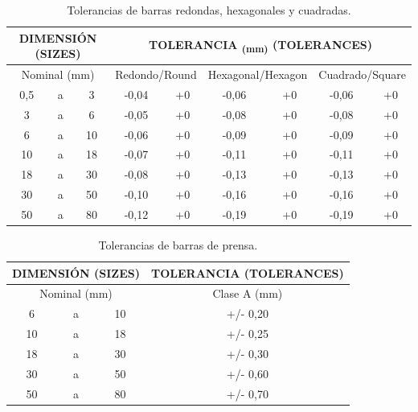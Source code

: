 \documentclass[12pt,a4paper]{article}
\begin{document}
\begin{table}[H]
   \centering
   \renewcommand{\arraystretch}{1.2}
   \begin{tabular}{|c|c|c|c|c|c|c|c|c|}
      \hline
      \multicolumn{3}{|p{3cm}|}{\textbf{DIMENSIÓN (SIZES)}} & \multicolumn{6}{|c|}{\textbf{TOLERANCIA \textsubscript{(\si{\milli\metre})} (TOLERANCES)}} \\ \hline
      \multicolumn{3}{|c|}{Nominal (\si{\milli\metre})} & \multicolumn{2}{|c|}{Redondo/Round} & \multicolumn{2}{|c|}{Hexagonal/Hexagon} & \multicolumn{2}{|c|}{Cuadrado/Square} \\ \hline
      0,5 & a & 3 & -0,04 & +0 & -0,06 & +0 & -0,06 & +0 \\ \hline
      3 & a & 6 & -0,05 & +0 & -0,08 & +0 & -0,08 & +0 \\ \hline
      6 & a & 10 & -0,06 & +0 & -0,09 & +0 & -0,09 & +0 \\ \hline 
      10 & a & 18 & -0,07 & +0 & -0,11 & +0 & -0,11 & +0 \\ \hline
      18 & a & 30 & -0,08 & +0 & -0,13 & +0 & -0,13 & +0 \\ \hline
      30 & a & 50 & -0,10 & +0 & -0,16 & +0 & -0,16 & +0 \\ \hline
      50 & a & 80 & -0,12 & +0 & -0,19 & +0 & -0,19 & +0 \\ \hline
   \end{tabular}
   \caption{Tolerancias de barras redondas, hexagonales y cuadradas.}
   \label{tab:tolerancias1}
\end{table}

\begin{table}[H]
   \centering
   \begin{tabular}{|c|c|c|c|}
      \hline
      \multicolumn{3}{|c|}{\textbf{DIMENSIÓN (SIZES)}} & {\textbf{TOLERANCIA (TOLERANCES)}} \\ \hline
      \multicolumn{3}{|c|}{Nominal (\si{\milli\metre})} & Clase A (\si{\milli\metre}) \\ \hline
      6 & a & 10 & +/- 0,20 \\ \hline
      10 & a & 18 & +/- 0,25 \\ \hline
      18 & a & 30 & +/- 0,30 \\ \hline
      30 & a & 50 & +/- 0,60 \\ \hline
      50 & a & 80 & +/- 0,70 \\ \hline
   \end{tabular}
   \caption{Tolerancias de barras de prensa.}
   \label{tab:tolerancias2}
\end{table}
\end{document}
